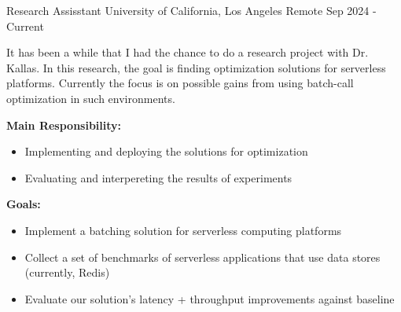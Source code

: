 

\begin{cventries}
  \cventry
  {Research Assisstant}
  {University of California, Los Angeles}
  {Remote}
  {Sep 2024 - Current}
  {
    \begin{cvitems}
    \item {It has been a while that I had the chance to do a research project
        with Dr. Kallas. In this research, the goal is finding optimization
        solutions for serverless platforms. Currently the focus is on possible
        gains from using batch-call optimization in such environments.}
    \item {\textbf{Main Responsibility:}
        \begin{itemize}[label=-]
        \item Implementing and deploying the solutions for optimization
        \item Evaluating and interpereting the results of experiments
        \end{itemize}
      }
    \item {\textbf{Goals:}
        \begin{itemize}[label=-]
        \item Implement a batching solution for serverless computing platforms
        \item Collect a set of benchmarks of serverless applications that use
          data stores (currently, Redis)
        \item Evaluate our solution’s latency + throughput improvements against baseline
        \end{itemize}
      }
    \end{cvitems}
  }


\end{cventries}

